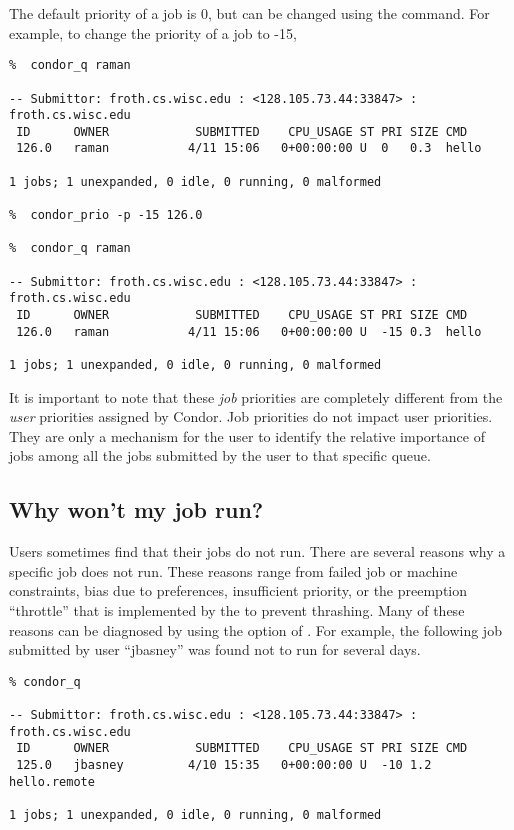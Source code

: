 The default priority of a job is 0, but can be changed using the 
command.  For example, to change the priority of a job to -15,
\begin{verbatim}
%  condor_q raman

-- Submittor: froth.cs.wisc.edu : <128.105.73.44:33847> : froth.cs.wisc.edu
 ID      OWNER            SUBMITTED    CPU_USAGE ST PRI SIZE CMD               
 126.0   raman           4/11 15:06   0+00:00:00 U  0   0.3  hello             

1 jobs; 1 unexpanded, 0 idle, 0 running, 0 malformed

%  condor_prio -p -15 126.0

%  condor_q raman

-- Submittor: froth.cs.wisc.edu : <128.105.73.44:33847> : froth.cs.wisc.edu
 ID      OWNER            SUBMITTED    CPU_USAGE ST PRI SIZE CMD               
 126.0   raman           4/11 15:06   0+00:00:00 U  -15 0.3  hello             

1 jobs; 1 unexpanded, 0 idle, 0 running, 0 malformed
\end{verbatim}

It is important to note that these \emph{job} priorities are completely 
different from the \emph{user} priorities assigned by Condor.  Job priorities
do not impact user priorities.  They are only a mechanism for the user to
identify the relative importance of jobs among all the jobs submitted by the
user to that specific queue.

\subsection{Why won't my job run?}
Users sometimes find that their jobs do not run.  There are several reasons why
a specific job does not run.  These reasons range from failed job or machine
constraints, bias due to preferences, insufficient priority, or the preemption
``throttle'' that is implemented by the  to prevent
thrashing.  Many of these reasons can be diagnosed by using the 
option of .  For example, the following job submitted by user
``jbasney'' was found not to run for several days.
\begin{verbatim}
% condor_q

-- Submittor: froth.cs.wisc.edu : <128.105.73.44:33847> : froth.cs.wisc.edu
 ID      OWNER            SUBMITTED    CPU_USAGE ST PRI SIZE CMD               
 125.0   jbasney         4/10 15:35   0+00:00:00 U  -10 1.2  hello.remote      

1 jobs; 1 unexpanded, 0 idle, 0 running, 0 malformed
\end{verbatim}

